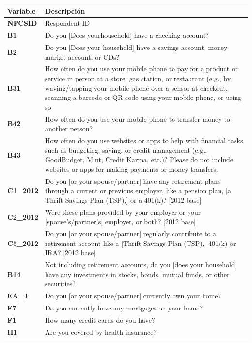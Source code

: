 \documentclass[a4paper, 11pt]{article}
\begin{document}
\begin{table}
\centering
\footnotesize
\begin{tabular}{>{\RaggedRight\hspace{0pt}}m{2cm} >{\RaggedRight\hspace{0pt}}m{11cm}}
\toprule
\textbf{Variable} & \textbf{Descripción} \\
\midrule
\textbf{NFCSID} & Respondent ID\\
\textbf{B1} & Do you [Does yourhousehold] have a checking account?  \\
\textbf{B2} & Do you [Does your household] have a savings account, money market account, or CDs?\\
\textbf{B31} & How often do you use your mobile phone to pay for a product or service in person at a store, gas station, or restaurant (e.g., by waving/tapping your mobile phone over a sensor at checkout, scanning a barcode or QR code using your mobile phone, or using so\\
\textbf{B42} & How often do you use your mobile phone to transfer money to another person?\\
\textbf{B43} & How often do you use websites or apps to help with financial tasks such as budgeting, saving, or credit management (e.g., GoodBudget, Mint, Credit Karma, etc.)? Please do not include websites or apps for making payments or money transfers.\\
\textbf{C1\_2012} & Do you [or your spouse/partner] have any retirement plans through a current or previous employer, like a pension plan, [a Thrift Savings Plan (TSP),] or a 401(k)? [2012 base] \\
\textbf{C2\_2012} & Were these plans provided by your employer or your [spouse's/partner's] employer, or both? [2012 base] \\
\textbf{C5\_2012} & Do you [or your spouse/partner] regularly contribute to a retirement account like a [Thrift Savings Plan (TSP),] 401(k) or IRA? [2012 base]\\
\textbf{B14} & Not including retirement accounts, do you [does your household] have any investments in stocks, bonds, mutual funds, or other securities? \\
\textbf{EA\_1} & Do you [or your spouse/partner] currently own your home?\\
\textbf{E7} & Do you currently have any mortgages on your home?\\
\textbf{F1} & How many credit cards do you have?\\
\textbf{H1} & Are you covered by health insurance?\\

\end{tabular}
\end{table}
\end{document}
